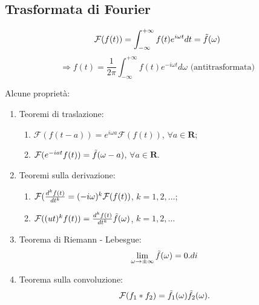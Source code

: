\subsection*{Trasformata di Fourier}

\begin{definition}
 \[
    \mathcal{F}(f(t))=\int_{-\infty}^{+\infty}f(t)e^{i\omega t}dt = \Tilde{f}(\omega)
 \]
 \[
    \Rightarrow f(t) = \frac{1}{2\pi} \int_{-\infty}^{+\infty}f(t)e^{-i\omega t}d\omega\text{ (antitrasformata)}
 \]
\end{definition}
 Alcune proprietà:
 \begin{enumerate}
     \item Teoremi di traslazione:
     \begin{enumerate}
         \item $\mathcal{F}(f(t-a))=e^{i\omega a}\mathcal{F}(f(t))$, $\forall a\in \mathbf{R}$;
         \item $\mathcal{F}(e^{-iat}f(t))=\Tilde{f}(\omega-a)$, $\forall a\in \mathbf{R}$.
     \end{enumerate}
     \item Teoremi sulla derivazione:
     \begin{enumerate}
         \item $\mathcal{F} (\frac{d^kf(t)}{dt^k}=(-i\omega)^k \mathcal{F}(f(t))$, $k=1,2,\dots$;
         \item $\mathcal{F}((ut)^kf(t)) = \frac{d^kf(t)}{dt^k}\Tilde{f}(\omega)$, $k=1,2,\dots$
     \end{enumerate}
     \item Teorema di Riemann - Lebesgue:
     \[
        \lim_{\omega\to\pm\infty}\Tilde f(\omega) =0.di
     \]
     \item Teorema sulla convoluzione:
     \[
        \mathcal{F}(f_1*f_2)=\Tilde{f_1}(\omega)\Tilde{f_2}(\omega).
     \]
 \end{enumerate}

